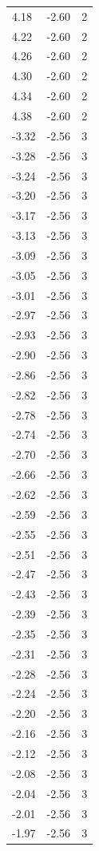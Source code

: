 \begin{longtable}{lrr}
  4.18 & -2.60 & 2 \\
  4.22 & -2.60 & 2 \\
  4.26 & -2.60 & 2 \\
  4.30 & -2.60 & 2 \\
  4.34 & -2.60 & 2 \\
  4.38 & -2.60 & 2 \\
  -3.32 & -2.56 & 3 \\
  -3.28 & -2.56 & 3 \\
  -3.24 & -2.56 & 3 \\
  -3.20 & -2.56 & 3 \\
  -3.17 & -2.56 & 3 \\
  -3.13 & -2.56 & 3 \\
  -3.09 & -2.56 & 3 \\
  -3.05 & -2.56 & 3 \\
  -3.01 & -2.56 & 3 \\
  -2.97 & -2.56 & 3 \\
  -2.93 & -2.56 & 3 \\
  -2.90 & -2.56 & 3 \\
  -2.86 & -2.56 & 3 \\
  -2.82 & -2.56 & 3 \\
  -2.78 & -2.56 & 3 \\
  -2.74 & -2.56 & 3 \\
  -2.70 & -2.56 & 3 \\
  -2.66 & -2.56 & 3 \\
  -2.62 & -2.56 & 3 \\
  -2.59 & -2.56 & 3 \\
  -2.55 & -2.56 & 3 \\
  -2.51 & -2.56 & 3 \\
  -2.47 & -2.56 & 3 \\
  -2.43 & -2.56 & 3 \\
  -2.39 & -2.56 & 3 \\
  -2.35 & -2.56 & 3 \\
  -2.31 & -2.56 & 3 \\
  -2.28 & -2.56 & 3 \\
  -2.24 & -2.56 & 3 \\
  -2.20 & -2.56 & 3 \\
  -2.16 & -2.56 & 3 \\
  -2.12 & -2.56 & 3 \\
  -2.08 & -2.56 & 3 \\
  -2.04 & -2.56 & 3 \\
  -2.01 & -2.56 & 3 \\
  -1.97 & -2.56 & 3 \\

\end{longtable}
